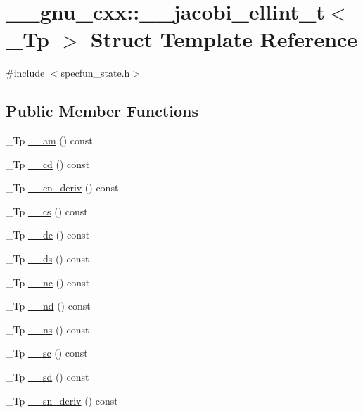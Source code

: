 \hypertarget{struct____gnu__cxx_1_1____jacobi__ellint__t}{}\section{\+\_\+\+\_\+gnu\+\_\+cxx\+:\+:\+\_\+\+\_\+jacobi\+\_\+ellint\+\_\+t$<$ \+\_\+\+Tp $>$ Struct Template Reference}
\label{struct____gnu__cxx_1_1____jacobi__ellint__t}


{\ttfamily \#include $<$specfun\+\_\+state.\+h$>$}

\subsection*{Public Member Functions}
\begin{DoxyCompactItemize}
\item 
\+\_\+\+Tp \hyperlink{struct____gnu__cxx_1_1____jacobi__ellint__t_ab9ac21f42a1fc90e86ba76394e413ea7}{\+\_\+\+\_\+am} () const
\item 
\+\_\+\+Tp \hyperlink{struct____gnu__cxx_1_1____jacobi__ellint__t_abd3b74424490d59d6c875c129776e3e5}{\+\_\+\+\_\+cd} () const
\item 
\+\_\+\+Tp \hyperlink{struct____gnu__cxx_1_1____jacobi__ellint__t_a0895d136257365d73c38a50b8dfbda81}{\+\_\+\+\_\+cn\+\_\+deriv} () const
\item 
\+\_\+\+Tp \hyperlink{struct____gnu__cxx_1_1____jacobi__ellint__t_a62a359aed4948d6148be0bded41a6982}{\+\_\+\+\_\+cs} () const
\item 
\+\_\+\+Tp \hyperlink{struct____gnu__cxx_1_1____jacobi__ellint__t_aefd62aec07250eff1fd91809ee6e3c01}{\+\_\+\+\_\+dc} () const
\item 
\+\_\+\+Tp \hyperlink{struct____gnu__cxx_1_1____jacobi__ellint__t_a95f2e2be7363103da283e15493b24bd7}{\+\_\+\+\_\+ds} () const
\item 
\+\_\+\+Tp \hyperlink{struct____gnu__cxx_1_1____jacobi__ellint__t_aee80a8bcb8314b98dc253459d9bb97c8}{\+\_\+\+\_\+nc} () const
\item 
\+\_\+\+Tp \hyperlink{struct____gnu__cxx_1_1____jacobi__ellint__t_ae9b801e3c7db84c7a632b0860e79a750}{\+\_\+\+\_\+nd} () const
\item 
\+\_\+\+Tp \hyperlink{struct____gnu__cxx_1_1____jacobi__ellint__t_a0cbaac72a887b3630554d0c07fcb3746}{\+\_\+\+\_\+ns} () const
\item 
\+\_\+\+Tp \hyperlink{struct____gnu__cxx_1_1____jacobi__ellint__t_ad8fd5ecb9ccd303c0e567131088841bb}{\+\_\+\+\_\+sc} () const
\item 
\+\_\+\+Tp \hyperlink{struct____gnu__cxx_1_1____jacobi__ellint__t_a17ff1af009b6c0cb7d240a9b5acf192d}{\+\_\+\+\_\+sd} () const
\item 
\+\_\+\+Tp \hyperlink{struct____gnu__cxx_1_1____jacobi__ellint__t_a6d4afe8f8a88ee064ec929f4597c3935}{\+\_\+\+\_\+sn\+\_\+deriv} () const
\end{DoxyCompactItemize}

